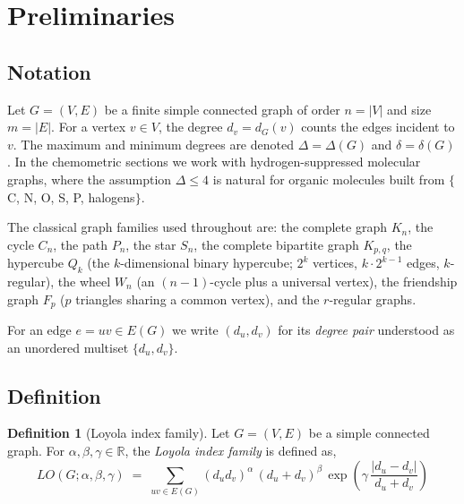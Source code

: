 \documentclass[a5paper, 10pt]{article}
\theoremstyle{plain}
\theoremstyle{remark}
\theoremstyle{definition}
\newtheorem{definition}{Definition}
\newcommand{\Wuzi}{LO(G;\alpha,\beta,\gamma)}
\begin{document}
\section{Preliminaries}\label{sec:prelim}

\subsection{Notation}\label{sec:notation}

Let $G = (V, E)$ be a finite simple connected graph of order
$n = |V|$ and size $m = |E|$. For a vertex $v \in V$, the degree
$d_v = d_G(v)$ counts the edges incident to $v$. The maximum and
minimum degrees are denoted $\Delta = \Delta(G)$ and
$\delta = \delta(G)$. In the chemometric sections we work with
hydrogen-suppressed molecular graphs, where the assumption
$\Delta \le 4$ is natural for organic molecules built from
$\{$C, N, O, S, P, halogens$\}$.

The classical graph families used throughout are: the complete
graph $K_n$, the cycle $C_n$, the path $P_n$, the star $S_n$, the complete
bipartite graph $K_{p,q}$, the hypercube $Q_k$ (the
$k$-dimensional binary hypercube; $2^k$ vertices,
$k \cdot 2^{k - 1}$ edges, $k$-regular), the wheel $W_n$ (an
$(n - 1)$-cycle plus a universal vertex), the friendship graph
$F_p$ ($p$ triangles sharing a common vertex), and the
$r$-regular graphs.

For an edge $e = uv \in E(G)$ we write $(d_u, d_v)$ for its
\emph{degree pair} understood as an unordered multiset
$\{d_u, d_v\}$.

\subsection{Definition}\label{sec:def}

\begin{definition}[Loyola index family]\label{def:wuzi}
Let $G = (V, E)$ be a simple connected graph. For
$\alpha, \beta, \gamma \in \mathbb{R}$, the \emph{Loyola index family}
is defined as,
\begin{equation}\label{eq:wuzi}
\Wuzi
\;=\; \sum_{uv \in E(G)}
(d_u d_v)^{\alpha}\,(d_u + d_v)^{\beta}\,
\exp\!\left(\gamma\,\frac{|d_u - d_v|}{d_u + d_v}\right)
\end{equation}
\end{definition}
\end{document}
